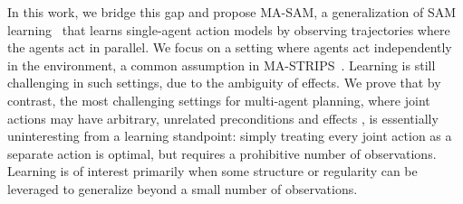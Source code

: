 \documentclass[letterpaper]{article} %
\theoremstyle{definition}
\theoremstyle{remark}
\newcommand{\sam}{\ac{SAM}\xspace}
\newcommand{\masam}{\ac{MA-SAM}\xspace}
\newcommand{\roni}[1]{{\textcolor{red}{[Roni: #1]}}}
\begin{document}


In this work, we bridge this gap and propose \masam, a generalization of \sam learning~ that learns single-agent action models by observing trajectories where the agents act in parallel.
We focus on a setting where agents act independently in the environment, a common assumption in MA-STRIPS~.
Learning is still challenging in such settings, due to the ambiguity of effects.
We prove that by contrast, the most challenging settings for multi-agent planning, where joint actions may have arbitrary, unrelated preconditions and effects \cite{boutilier2001partial}, is essentially uninteresting from a learning standpoint: simply treating every joint action as a separate action is optimal, but requires a prohibitive number of observations. Learning is of interest primarily when some structure or regularity can be leveraged to generalize beyond a small number of observations.
\end{document}

